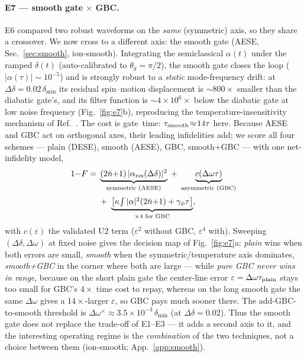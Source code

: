 \documentclass[aps,prapplied,twocolumn,superscriptaddress,floatfix,nofootinbib]{revtex4-2}
\begin{document}
\paragraph{E7 --- smooth gate $\times$ GBC.} E6 compared two robust waveforms on the
\emph{same} (symmetric) axis, so they share a crossover. We now cross to a different axis: the smooth
gate (AESE, Sec.~\ref{sec:smooth}, \textsf{ion-smooth}). Integrating the semiclassical $\alpha(t)$
under the ramped $\delta(t)$ (auto-calibrated to $\theta_g=\pi/2$), the smooth gate closes the loop
($|\alpha(\tau)|\!\sim\!10^{-5}$) and is strongly robust to a \emph{static} mode-frequency drift: at
$\Delta\delta=0.02\,\delta_{\min}$ its residual spin--motion displacement is $\sim\!800\times$
smaller than the diabatic gate's, and its filter function is $\sim\!4\times10^{6}\times$ below the
diabatic gate at low noise frequency (Fig.~\ref{fig:e7}b), reproducing the temperature-insensitivity
mechanism of Ref.~\cite{Hughes25}. The cost is gate~time: $\tau_{\rm smooth}\!\approx\!14\tau$ here.
Because AESE and GBC act on orthogonal axes, their leading infidelities add; we score all four
schemes --- plain (DESE), smooth (AESE), GBC, smooth+GBC --- with one net-infidelity model,
\begin{equation}
\begin{split}
1{-}F={}&\underbrace{(2\bar n{+}1)\,|\alpha_{\rm res}(\Delta\delta)|^2}_{\text{symmetric (AESE)}}
\;+\;\underbrace{c(\Delta\omega\tau)}_{\text{asymmetric (GBC)}}\\[2pt]
&+\;\underbrace{\big[\kappa\!\textstyle\int|\alpha|^2(2\bar n{+}1)+\gamma_\phi\tau\big]}_{\times4\text{ for GBC}},
\end{split}
\end{equation}
with $c(\varepsilon)$ the validated U2 term ($\varepsilon^2$ without GBC, $\varepsilon^4$ with).
Sweeping $(\Delta\delta,\Delta\omega)$ at fixed noise gives the decision map of Fig.~\ref{fig:e7}a:
\emph{plain} wins when both errors are small, \emph{smooth} when the symmetric/temperature axis
dominates, \emph{smooth+GBC} in the corner where both are large --- while \emph{pure GBC never wins
in range}, because on the short plain gate the center-line error $\varepsilon=\Delta\omega\tau_{\rm plain}$
stays too small for GBC's $4\times$ time cost to repay, whereas on the long smooth gate the same
$\Delta\omega$ gives a $14\times$-larger $\varepsilon$, so GBC pays much sooner there. The
add-GBC-to-smooth threshold is $\Delta\omega^\times\!\approx\!3.5\times10^{-3}\,\delta_{\min}$ (at
$\Delta\delta=0.02$). Thus the smooth gate does not replace the trade-off of E1--E3 --- it adds a
second axis to it, and the interesting operating regime is the \emph{combination} of the two
techniques, not a choice between them (\textsf{ion-smooth}; App.~\ref{app:smooth}).
\end{document}
